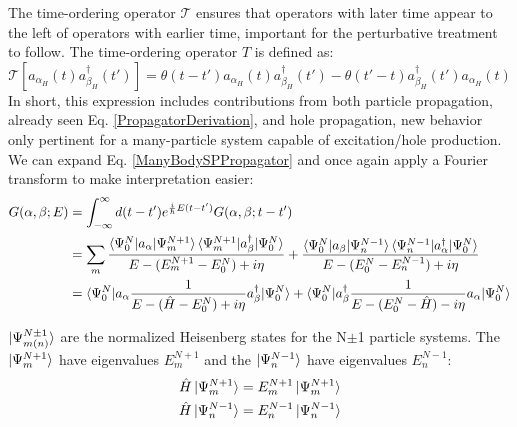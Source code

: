 \noindent
The time-ordering operator $\mathcal{T}$ ensures
that operators with later time appear to the left
of operators with earlier time\footnotemark, important for the perturbative treatment to follow.
\footnotetext
{
    The time-ordering operator $T$ is defined as:
    \begin{equation*}
        \mathcal{T}[a_{\alpha_{H}}(t)a^{\dagger}_{\beta_{H}}(t')]=\theta(t-t')a_{\alpha_{H}}(t)a^{\dagger}_{\beta_{H}}(t')
        -\theta(t'-t)a^{\dagger}_{\beta_{H}}(t')a_{\alpha_{H}}(t)
    \end{equation*}
}
In short, this expression includes contributions from both particle propagation, already seen 
Eq. \ref{PropagatorDerivation}, and hole propagation, new behavior only
pertinent for a many-particle system capable of excitation/hole production. We can expand Eq.
\ref{ManyBodySPPropagator} and once again apply a Fourier transform to make
interpretation easier:
\begin{equation} \label{LehmannRepresentation}
    \begin{split}
        G(\alpha,\beta;E) & =
        \int_{-\infty}^{\infty}d(t-t')e^{\frac{i}{\hbar}E(t-t')}G(\alpha,\beta;t-t')\\
        & = \sum_m
        \frac{\braket{\Psi^{N}_{0}|a_{\alpha}|\Psi^{N+1}_{m}}\braket{\Psi^{N+1}_{m}|a^{\dagger}_{\beta}|\Psi^{N}_{0}}}
        {E-(E^{N+1}_{m}-E^{N}_{0})+i\eta} +
        \frac{\braket{\Psi^{N}_{0}|a_{\beta}|\Psi^{N-1}_{n}}\braket{\Psi^{N-1}_{n}|a^{\dagger}_{\alpha}|\Psi^{N}_{0}}}
        {E-(E^{N}_{0}-E^{N-1}_{n})+i\eta}\\
        & =
        \braket{\Psi^{N}_{0}|a_{\alpha}\frac{1}{E-(\hat{H}-E_{0}^{N})+i\eta}a^{\dagger}_{\beta}|\Psi^{N}_{0}} +
        \braket{\Psi^{N}_{0}|a^{\dagger}_{\beta}\frac{1}{E-(E^{N}_{0}-\hat{H})-i\eta}a_{\alpha}|\Psi^{N}_{0}}
    \end{split}
\end{equation}

\noindent
$\ket{\Psi^{N\pm1}_{m(n)}}$ are the normalized Heisenberg states for the N$\pm$1 particle 
systems. The $\ket{\Psi^{N+1}_{m}}$ have eigenvalues $E^{N+1}_{m}$ and the
$\ket{\Psi^{N-1}_{n}}$ have 
eigenvalues $E^{N-1}_{n}$:
\begin{equation}
    \begin{split}
        \hat{H}\ket{\Psi^{N+1}_{m}} & = E^{N+1}_{m}\ket{\Psi^{N+1}_{m}}\\
        \hat{H}\ket{\Psi^{N-1}_{n}} & = E^{N-1}_{n}\ket{\Psi^{N-1}_{n}}
    \end{split}
\end{equation}


